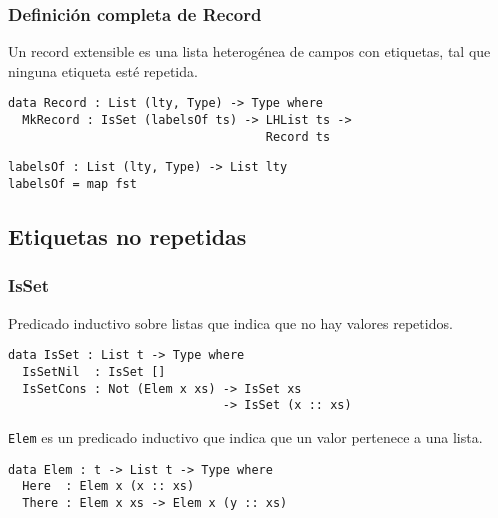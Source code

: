 \documentclass{beamer}
\begin{document}
\begin{frame}[fragile]
\frametitle{Definición completa de Record}

Un record extensible es una lista heterogénea de campos con etiquetas, tal que ninguna etiqueta esté repetida.

\pause

\begin{definition}
\begin{verbatim}
data Record : List (lty, Type) -> Type where
  MkRecord : IsSet (labelsOf ts) -> LHList ts ->
                                    Record ts
\end{verbatim}
\end{definition}

\begin{definition}
\begin{verbatim}
labelsOf : List (lty, Type) -> List lty
labelsOf = map fst
\end{verbatim}
\end{definition}

\end{frame}

\subsection{Etiquetas no repetidas}

\begin{frame}[fragile]
\frametitle{IsSet}

Predicado inductivo sobre listas que indica que no hay valores repetidos.

\pause

\begin{definition}
\begin{verbatim}
data IsSet : List t -> Type where
  IsSetNil  : IsSet []
  IsSetCons : Not (Elem x xs) -> IsSet xs
                              -> IsSet (x :: xs)
\end{verbatim}
\end{definition}

\pause

\texttt{Elem} es un predicado inductivo que indica que un valor pertenece a una lista.

\begin{definition}
\begin{verbatim}
data Elem : t -> List t -> Type where
  Here  : Elem x (x :: xs)
  There : Elem x xs -> Elem x (y :: xs)
\end{verbatim}
\end{definition}

\end{frame}
\end{document}
